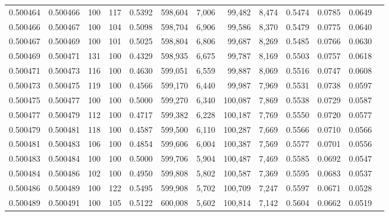 \begin{tabular}{rrrrrrrrrrrrr}
0.500464 & 0.500466 &   100 & 117 &                                     0.5392 & 598,604 &   7,006 &  99,482 &   8,474 & 0.5474 & 0.0785 & 0.0649 \\
0.500466 & 0.500467 &   100 & 104 &                                     0.5098 & 598,704 &   6,906 &  99,586 &   8,370 & 0.5479 & 0.0775 & 0.0640 \\
0.500467 & 0.500469 &   100 & 101 &                                     0.5025 & 598,804 &   6,806 &  99,687 &   8,269 & 0.5485 & 0.0766 & 0.0630 \\
0.500469 & 0.500471 &   131 & 100 &                                     0.4329 & 598,935 &   6,675 &  99,787 &   8,169 & 0.5503 & 0.0757 & 0.0618 \\
0.500471 & 0.500473 &   116 & 100 &                                     0.4630 & 599,051 &   6,559 &  99,887 &   8,069 & 0.5516 & 0.0747 & 0.0608 \\
0.500473 & 0.500475 &   119 & 100 &                                     0.4566 & 599,170 &   6,440 &  99,987 &   7,969 & 0.5531 & 0.0738 & 0.0597 \\
0.500475 & 0.500477 &   100 & 100 &                                     0.5000 & 599,270 &   6,340 & 100,087 &   7,869 & 0.5538 & 0.0729 & 0.0587 \\
0.500477 & 0.500479 &   112 & 100 &                                     0.4717 & 599,382 &   6,228 & 100,187 &   7,769 & 0.5550 & 0.0720 & 0.0577 \\
0.500479 & 0.500481 &   118 & 100 &                                     0.4587 & 599,500 &   6,110 & 100,287 &   7,669 & 0.5566 & 0.0710 & 0.0566 \\
0.500481 & 0.500483 &   106 & 100 &                                     0.4854 & 599,606 &   6,004 & 100,387 &   7,569 & 0.5577 & 0.0701 & 0.0556 \\
0.500483 & 0.500484 &   100 & 100 &                                     0.5000 & 599,706 &   5,904 & 100,487 &   7,469 & 0.5585 & 0.0692 & 0.0547 \\
0.500484 & 0.500486 &   102 & 100 &                                     0.4950 & 599,808 &   5,802 & 100,587 &   7,369 & 0.5595 & 0.0683 & 0.0537 \\
0.500486 & 0.500489 &   100 & 122 &                                     0.5495 & 599,908 &   5,702 & 100,709 &   7,247 & 0.5597 & 0.0671 & 0.0528 \\
0.500489 & 0.500491 &   100 & 105 &                                     0.5122 & 600,008 &   5,602 & 100,814 &   7,142 & 0.5604 & 0.0662 & 0.0519 \\

\end{tabular}
